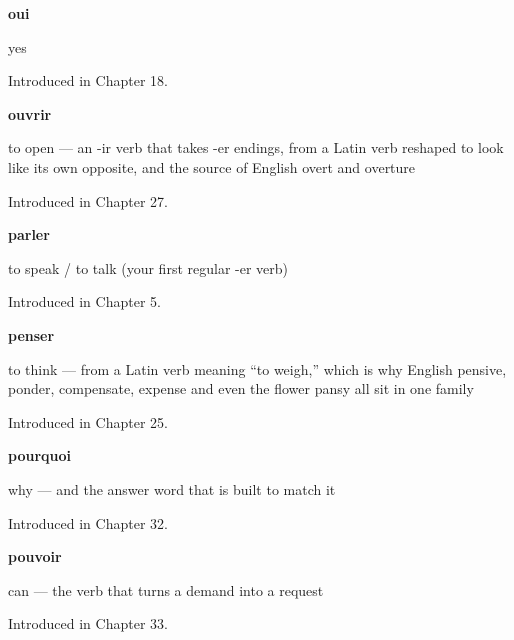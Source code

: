 \noindent\begin{minipage}[t]{\linewidth}
\raggedright
\textbf{oui}\par
\small yes\par
\footnotesize Introduced in Chapter 18.
\end{minipage}\par\medskip

\noindent\begin{minipage}[t]{\linewidth}
\raggedright
\textbf{ouvrir}\par
\small to open — an -ir verb that takes -er endings, from a Latin verb reshaped to look like its own opposite, and the source of English overt and overture\par
\footnotesize Introduced in Chapter 27.
\end{minipage}\par\medskip

\noindent\begin{minipage}[t]{\linewidth}
\raggedright
\textbf{parler}\par
\small to speak / to talk (your first regular -er verb)\par
\footnotesize Introduced in Chapter 5.
\end{minipage}\par\medskip

\noindent\begin{minipage}[t]{\linewidth}
\raggedright
\textbf{penser}\par
\small to think — from a Latin verb meaning \textquotedblleft{}to weigh,\textquotedblright{} which is why English pensive, ponder, compensate, expense and even the flower pansy all sit in one family\par
\footnotesize Introduced in Chapter 25.
\end{minipage}\par\medskip

\noindent\begin{minipage}[t]{\linewidth}
\raggedright
\textbf{pourquoi}\par
\small why — and the answer word that is built to match it\par
\footnotesize Introduced in Chapter 32.
\end{minipage}\par\medskip

\noindent\begin{minipage}[t]{\linewidth}
\raggedright
\textbf{pouvoir}\par
\small can — the verb that turns a demand into a request\par
\footnotesize Introduced in Chapter 33.
\end{minipage}\par\medskip

